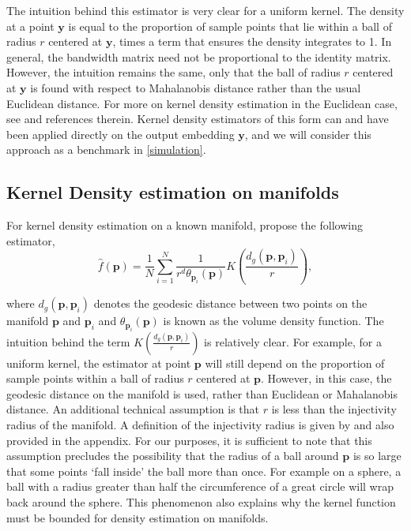 \documentclass[12pt]{article}
\begin{document}
The intuition behind this estimator is very clear for a uniform kernel. The density at a point \(\bm{y}\) is equal to the proportion of sample points that lie within a ball of radius \(r\) centered at \(\bm{y}\), times a term that ensures the density integrates to 1. In general, the bandwidth matrix need not be proportional to the identity matrix. However, the intuition remains the same, only that the ball of radius \(r\) centered at \(\bm{y}\) is found with respect to Mahalanobis distance rather than the usual Euclidean distance. For more on kernel density estimation in the Euclidean case, see \textcite{Scott2015-vl} and references therein. Kernel density estimators of this form can and have been applied directly on the output embedding \(\bm{y}\), and we will consider this approach as a benchmark in \autoref{simulation}.

\hypertarget{Pellet}{%
\subsection{Kernel Density estimation on manifolds}\label{Pellet}}

For kernel density estimation on a known manifold, \textcite{Pelletier2005-vu} propose the following estimator,
\begin{equation}
\label{eq:denriem}
\hat{f}(\bm{p}) = \frac{1}{N} \sum_{i=1}^{N} \frac{1}{r^d \theta_{\bm{p}_i}(\bm{p})} K\left(\frac{d_g(\bm{p}, \bm{p}_i)}{r}\right),
\end{equation}

where \(d_g(\bm{p}, \bm{p}_i)\) denotes the geodesic distance between two points on the manifold \(\bm{p}\) and \(\bm{p}_i\) and \(\theta_{\bm{p}_i}(\bm{p})\) is known as the volume density function. The intuition behind the term \(K\left(\frac{d_g(\bm{p}, \bm{p}_i)}{r}\right)\) is relatively clear. For example, for a uniform kernel, the estimator at point \(\bm{p}\) will still depend on the proportion of sample points within a ball of radius \(r\) centered at \(\bm{p}\). However, in this case, the geodesic distance on the manifold is used, rather than Euclidean or Mahalanobis distance. An additional technical assumption is that \(r\) is less than the injectivity radius of the manifold. A definition of the injectivity radius is given by \textcite{Chavel2006-mp} and also provided in the appendix. For our purposes, it is sufficient to note that this assumption precludes the possibility that the radius of a ball around \(\bm{p}\) is so large that some points `fall inside' the ball more than once. For example on a sphere, a ball with a radius greater than half the circumference of a great circle will wrap back around the sphere. This phenomenon also explains why the kernel function must be bounded for density estimation on manifolds.
\end{document}
